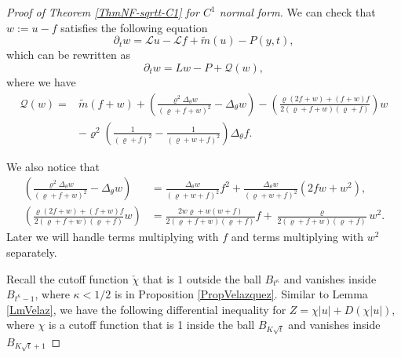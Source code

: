 \documentclass[11pt]{amsart}
\numberwithin{equation}{section}
\numberwithin{equation}{section}
\newcommand{\sL}{\mathscr{L}}
\newcommand{\pr}{\partial}
\begin{document}
	\begin{proof}[Proof of Theorem \ref{ThmNF-sqrtt-C1} for $C^1$ normal form]
		
		We can check that $w:=u-f$ satisfies the following equation
		\begin{equation}\label{eq:C1_diff_equation}
			\pr_t w
			=
			\sL u-\sL f
			+\tilde{m}(u)
			-P(y,t),
		\end{equation}
		which can be rewritten as	\begin{equation}\label{EqNoZeroModes}
			\pr_t w=L w-P+\mathscr Q(w),
		\end{equation}
		where we have \[
		\begin{split}
			\mathscr Q(w)=&\tilde m(f+w)+\left(\frac{\varrho^2\Delta_\theta w}{(\varrho+f+w)^2}-\Delta_\theta w\right)
			-\left(
			\frac{\varrho(2f+w)+(f+w)f}{2(\varrho+f+w)(\varrho+f)}
			\right)w
			\\&
			-\varrho^2\left(\frac{1}{(\varrho+f)^2}-\frac{1}{(\varrho+w+f)^2}
			\right)\Delta_\theta f.
		\end{split}
		\]
		
		We also notice that \begin{align*}
			\left(\frac{\varrho^2\Delta_\theta w}{(\varrho+f+w)^2}-\Delta_\theta w\right)&=\frac{\Delta_\theta w}{(\varrho+w+f)^2}f^2+\frac{\Delta_\theta w}{(\varrho+w+f)^2}(2fw+w^2),
			\\
			\left(\frac{\varrho(2f+w)+(f+w)f}{2(\varrho+f+w)(\varrho+f)}w\right)&=
			\frac{2w\varrho+w(w+f)}{2(\varrho+f+w)(\varrho+f)}f+\frac{\varrho}{2(\varrho+f+w)(\varrho+f)}w^2.
		\end{align*} Later we will handle terms multiplying with $f$ and terms multiplying with $w^2$ separately.
		
		Recall the cutoff function $\check\chi$ that is $1$ outside the ball $B_{t^\kappa}$ and vanishes inside $B_{t^\kappa-1}$, where $\kappa<1/2$ is in Proposition \ref{PropVelazquez}. Similar to Lemma \ref{LmVelaz}, we have the following differential inequality for $Z=\chi|u|+D(\chi |u|)$, where $\chi$ is a cutoff function that is 1 inside the ball $B_{K \sqrt{t}}$ and vanishes inside $B_{K\sqrt{t}+1}$
		

\end{proof}
\end{document}
